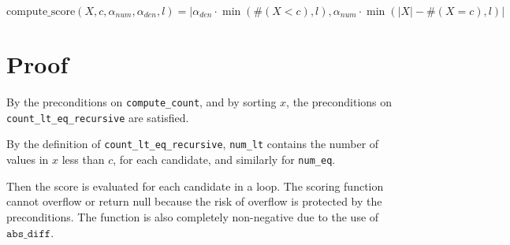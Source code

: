 \documentclass{article}
\begin{document}
\begin{equation}
    \textrm{compute\_score}(X, c, \alpha_{num}, \alpha_{den}, l) = |\alpha_{den} \cdot \min(\#(X < c), l), \alpha_{num} \cdot \min(|X| - \#(X = c), l)|
\end{equation}


\section{Proof}

By the preconditions on \texttt{compute\_count},
and by sorting $x$, the preconditions on \texttt{count\_lt\_eq\_recursive} are satisfied.

By the definition of \texttt{count\_lt\_eq\_recursive},
\texttt{num\_lt} contains the number of values in $x$ less than $c$, for each candidate,
and similarly for \texttt{num\_eq}.

Then the score is evaluated for each candidate in a loop.
The scoring function cannot overflow or return null because the risk of overflow is protected
by the preconditions.
The function is also completely non-negative due to the use of $\texttt{abs\_diff}$.
\end{document}
